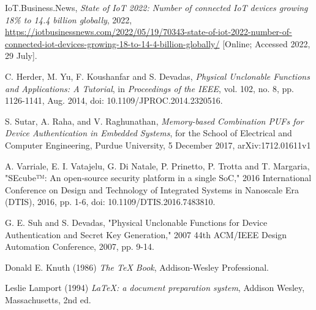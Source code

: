 \begin{thebibliography}{9}

IoT.Business.News, \emph{State of IoT 2022: Number of connected IoT devices growing 18\% to 14.4 billion globally},  2022, \url{https://iotbusinessnews.com/2022/05/19/70343-state-of-iot-2022-number-of-connected-iot-devices-growing-18-to-14-4-billion-globally/} [Online; Accessed 2022, 29 July].

C. Herder, M. Yu, F. Koushanfar and S. Devadas, \emph{Physical Unclonable Functions and Applications: A Tutorial}, in \emph{Proceedings of the IEEE}, vol. 102, no. 8, pp. 1126-1141, Aug. 2014, doi: 10.1109/JPROC.2014.2320516.

S. Sutar, A. Raha, and V. Raghunathan, \emph{Memory-based Combination PUFs for Device Authentication in Embedded Systems}, for the School of Electrical and Computer Engineering, Purdue University, 5 December 2017, arXiv:1712.01611v1

A. Varriale, E. I. Vatajelu, G. Di Natale, P. Prinetto, P. Trotta and T. Margaria, "SEcube™: An open-source security platform in a single SoC," 2016 International Conference on Design and Technology of Integrated Systems in Nanoscale Era (DTIS), 2016, pp. 1-6, doi: 10.1109/DTIS.2016.7483810.

G. E. Suh and S. Devadas, "Physical Unclonable Functions for Device Authentication and Secret Key Generation," 2007 44th ACM/IEEE Design Automation Conference, 2007, pp. 9-14.




Donald E. Knuth (1986) \emph{The \TeX{} Book}, Addison-Wesley Professional.

Leslie Lamport (1994) \emph{\LaTeX: a document preparation system}, Addison
Wesley, Massachusetts, 2nd ed.


    
\end{thebibliography}